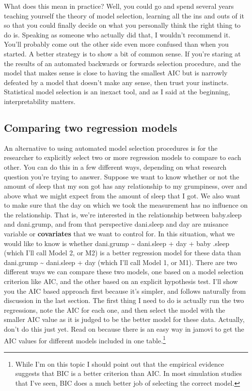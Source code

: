 \documentclass[
  a4paper,
]{book}
\begin{document}
What does this mean in practice? Well, you could go and spend several
years teaching yourself the theory of model selection, learning all the
ins and outs of it so that you could finally decide on what you
personally think the right thing to do is. Speaking as someone who
actually did that, I wouldn't recommend it. You'll probably come out the
other side even more confused than when you started. A better strategy
is to show a bit of common sense. If you're staring at the results of an
automated backwards or forwards selection procedure, and the model that
makes sense is close to having the smallest AIC but is narrowly defeated
by a model that doesn't make any sense, then trust your instincts.
Statistical model selection is an inexact tool, and as I said at the
beginning, interpretability matters.

\hypertarget{comparing-two-regression-models}{%
\subsection{Comparing two regression
models}\label{comparing-two-regression-models}}

An alternative to using automated model selection procedures is for the
researcher to explicitly select two or more regression models to compare
to each other. You can do this in a few different ways, depending on
what research question you're trying to answer. Suppose we want to know
whether or not the amount of sleep that my son got has any relationship
to my grumpiness, over and above what we might expect from the amount of
sleep that I got. We also want to make sure that the day on which we
took the measurement has no influence on the relationship. That is,
we're interested in the relationship between baby.sleep and dani.grump,
and from that perspective dani.sleep and day are nuisance variable or
\textbf{covariates} that we want to control for. In this situation, what
we would like to know is whether dani.grump \textasciitilde{} dani.sleep
+ day + baby .sleep (which I'll call Model 2, or M2) is a better
regression model for these data than dani.grump \textasciitilde{}
dani.sleep + day (which I'll call Model 1, or M1). There are two
different ways we can compare these two models, one based on a model
selection criterion like AIC, and the other based on an explicit
hypothesis test. I'll show you the AIC based approach first because it's
simpler, and follows naturally from discussion in the last section. The
first thing I need to do is actually run the two regressions, note the
AIC for each one, and then select the model with the smaller AIC value
as it is judged to be the better model for these data. Actually, don't
do this just yet. Read on because there is an easy way in jamovi to get
the AIC values for different models included in one table.\footnote{While
  I'm on this topic I should point out that the empirical evidence
  suggests that BIC is a better criterion than AIC. In most simulation
  studies that I've seen, BIC does a much better job of selecting the
  correct model.}
\end{document}
